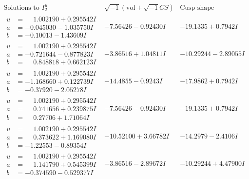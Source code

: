 \documentclass[1p]{elsarticle_modified}
\theoremstyle{definition}
\newcommand{\I}{\sqrt{-1}}
\begin{document}
$$\begin{array}{c|c|c}  
\text{Solutions to }I^u_{2}& \I (\text{vol} + \sqrt{-1}CS) & \text{Cusp shape}\\
 \hline 
\begin{aligned}
u &= \phantom{-}1.002190 + 0.295542 I \\
a &= -0.045030 - 1.035750 I \\
b &= -0.10013 - 1.43609 I\end{aligned}
 & -7.56426 - 0.92430 I & -19.1335 + 0.7942 I \\ \hline\begin{aligned}
u &= \phantom{-}1.002190 + 0.295542 I \\
a &= -0.721644 - 0.877823 I \\
b &= \phantom{-}0.848818 + 0.662123 I\end{aligned}
 & -3.86516 + 1.04811 I & -10.29244 - 2.89055 I \\ \hline\begin{aligned}
u &= \phantom{-}1.002190 + 0.295542 I \\
a &= -1.168660 + 0.122739 I \\
b &= -0.37920 - 2.05278 I\end{aligned}
 & -14.4855 - 0.9243 I & -17.9862 + 0.7942 I \\ \hline\begin{aligned}
u &= \phantom{-}1.002190 + 0.295542 I \\
a &= \phantom{-}0.741656 + 0.239875 I \\
b &= \phantom{-}0.27706 + 1.71064 I\end{aligned}
 & -7.56426 - 0.92430 I & -19.1335 + 0.7942 I \\ \hline\begin{aligned}
u &= \phantom{-}1.002190 + 0.295542 I \\
a &= \phantom{-}0.373622 + 1.169080 I \\
b &= -1.22553 - 0.89354 I\end{aligned}
 & -10.52100 + 3.66782 I & -14.2979 - 2.4106 I \\ \hline\begin{aligned}
u &= \phantom{-}1.002190 + 0.295542 I \\
a &= \phantom{-}1.141790 + 0.545399 I \\
b &= -0.374590 - 0.529377 I\end{aligned}
 & -3.86516 - 2.89672 I & -10.29244 + 4.47900 I \\ \hline\begin{aligned}

\end{aligned}
\end{array}$$
\end{document}
